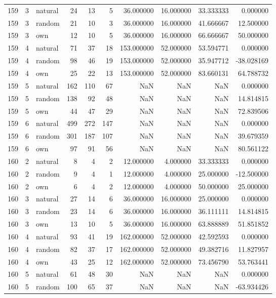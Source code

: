 \begin{table}[htbp]
\begin{tabular}{rrlrrrrrrr}
159 & 3 & natural & 24 & 13 & 5 & 36.000000 & 16.000000 & 33.333333 & 0.000000 \\
159 & 3 & random & 21 & 10 & 3 & 36.000000 & 16.000000 & 41.666667 & 12.500000 \\
159 & 3 & own & 12 & 10 & 5 & 36.000000 & 16.000000 & 66.666667 & 50.000000 \\
159 & 4 & natural & 71 & 37 & 18 & 153.000000 & 52.000000 & 53.594771 & 0.000000 \\
159 & 4 & random & 98 & 46 & 19 & 153.000000 & 52.000000 & 35.947712 & -38.028169 \\
159 & 4 & own & 25 & 22 & 13 & 153.000000 & 52.000000 & 83.660131 & 64.788732 \\
159 & 5 & natural & 162 & 110 & 67 & NaN & NaN & NaN & 0.000000 \\
159 & 5 & random & 138 & 92 & 48 & NaN & NaN & NaN & 14.814815 \\
159 & 5 & own & 44 & 47 & 29 & NaN & NaN & NaN & 72.839506 \\
159 & 6 & natural & 499 & 272 & 147 & NaN & NaN & NaN & 0.000000 \\
159 & 6 & random & 301 & 187 & 107 & NaN & NaN & NaN & 39.679359 \\
159 & 6 & own & 97 & 91 & 56 & NaN & NaN & NaN & 80.561122 \\
160 & 2 & natural & 8 & 4 & 2 & 12.000000 & 4.000000 & 33.333333 & 0.000000 \\
160 & 2 & random & 9 & 4 & 1 & 12.000000 & 4.000000 & 25.000000 & -12.500000 \\
160 & 2 & own & 6 & 4 & 2 & 12.000000 & 4.000000 & 50.000000 & 25.000000 \\
160 & 3 & natural & 27 & 14 & 6 & 36.000000 & 16.000000 & 25.000000 & 0.000000 \\
160 & 3 & random & 23 & 14 & 6 & 36.000000 & 16.000000 & 36.111111 & 14.814815 \\
160 & 3 & own & 13 & 10 & 5 & 36.000000 & 16.000000 & 63.888889 & 51.851852 \\
160 & 4 & natural & 93 & 41 & 19 & 162.000000 & 52.000000 & 42.592593 & 0.000000 \\
160 & 4 & random & 82 & 37 & 17 & 162.000000 & 52.000000 & 49.382716 & 11.827957 \\
160 & 4 & own & 43 & 25 & 12 & 162.000000 & 52.000000 & 73.456790 & 53.763441 \\
160 & 5 & natural & 61 & 48 & 30 & NaN & NaN & NaN & 0.000000 \\
160 & 5 & random & 100 & 65 & 37 & NaN & NaN & NaN & -63.934426 \\

\end{tabular}
\end{table}
